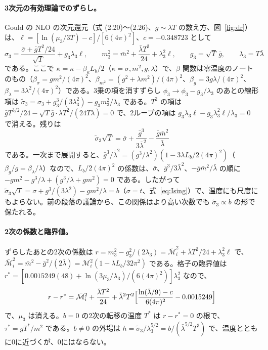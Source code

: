 \documentclass[a4paper,10pt]{ltjsarticle}
\begin{document}
\paragraph{3次元の有効理論でのずらし。}Gould の NLO の次元還元（式 (2.20)〜(2.26)、$g\sim\lambda T$ の数え方、図~\ref{fig:dr}）は、$\ell=[\ln(\mu_3/3T)-c]/[6(4\pi)^2]$、$c=-0.348723$ として
\begin{equation*}
\sigma_3=\frac{\bar\sigma+\bar gT^2/24}{\sqrt T}+g_3\lambda_3\ell,\qquad
m_3^2=\bar m^2+\frac{\bar\lambda T^2}{24}+\lambda_3^2\ell,\qquad g_3=\sqrt T\,\bar g,\qquad \lambda_3=T\bar\lambda
\end{equation*}
である。ここで $\bar\kappa=\kappa-\beta_\kappa L_b/2$（$\kappa=\sigma,m^2,g,\lambda$）で、$\beta$ 関数は零温度のノートのもの（$\beta_\sigma=gm^2/(4\pi)^2$、$\beta_{m^2}=(g^2+\lambda m^2)/(4\pi)^2$、$\beta_g=3g\lambda/(4\pi)^2$、$\beta_\lambda=3\lambda^2/(4\pi)^2$）である。3乗の項を消すずらし $\phi_3\to\phi_3-g_3/\lambda_3$ のあとの線形項は $\tilde\sigma_3=\sigma_3+g_3^3/(3\lambda_3^2)-g_3m_3^2/\lambda_3$ である。$T^2$ の項は $\bar gT^{3/2}/24-\sqrt T\bar g\cdot\bar\lambda T^2/(24T\bar\lambda)=0$ で、2ループの項は $g_3\lambda_3\ell-g_3\lambda_3^2\ell/\lambda_3=0$ で消える。残りは
\begin{equation*}
\tilde\sigma_3\sqrt T=\bar\sigma+\frac{\bar g^3}{3\bar\lambda^2}-\frac{\bar g\bar m^2}{\bar\lambda}
\end{equation*}
である。一次まで展開すると、$\bar g^3/\bar\lambda^2=(g^3/\lambda^2)(1-3\lambda L_b/2(4\pi)^2)$（$\beta_g/g=\beta_\lambda/\lambda$）なので、$L_b/2(4\pi)^2$ の係数は、$\bar\sigma$、$\bar g^3/3\bar\lambda^2$、$-\bar g\bar m^2/\bar\lambda$ の順に $-gm^2-g^3/\lambda+(g^3/\lambda+gm^2)=0$ である。したがって $\tilde\sigma_3\sqrt T=\sigma+g^3/(3\lambda^2)-gm^2/\lambda=b$（$\sigma=t$、式~\eqref{eq:Ising}）で、温度にも尺度にもよらない。前の段落の議論から、この関係はより高い次数でも $\tilde\sigma_3\propto b$ の形で保たれる。

\paragraph{2次の係数と臨界値。}ずらしたあとの2次の係数は $r=m_3^2-g_3^2/(2\lambda_3)=\bar{\mathcal M}_i^2+\bar\lambda T^2/24+\lambda_3^2\ell$ で、$\bar{\mathcal M}_i^2=\bar m^2-\bar g^2/(2\bar\lambda)=\mathcal M_i^2(1-\lambda L_b/32\pi^2)$ である。格子の臨界値は $r^*=[0.0015249(48)+\ln(3\mu_3/\lambda_3)/(6(4\pi)^2)]\lambda_3^2$ なので、
\begin{equation*}
r-r^*=\bar{\mathcal M}_i^2+\frac{\bar\lambda T^2}{24}+\bar\lambda^2T^2\Bigl[\frac{\ln(\bar\lambda/9)-c}{6(4\pi)^2}-0.0015249\Bigr]
\end{equation*}
で、$\mu_3$ は消える。$b=0$ の2次の転移の温度 $T^*$ は $r-r^*=0$ の根で、$\tau^*=gT^*/m^2$ である。$b\ne0$ の外場は $h=\tilde\sigma_3/\lambda_3^{5/2}=b/(\bar\lambda^{5/2}T^3)$ で、温度とともに0に近づくが、0にはならない。
\end{document}

